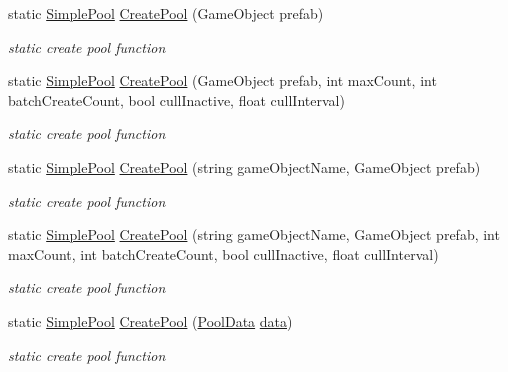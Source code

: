 \begin{DoxyCompactItemize}
static \hyperlink{class_darkhexxa_1_1_simple_pool_1_1_simple_pool}{Simple\-Pool} \hyperlink{class_darkhexxa_1_1_simple_pool_1_1_simple_pool_a857d7f94168bb44468149385efae0855}{Create\-Pool} (Game\-Object prefab)
\begin{DoxyCompactList}\small\item\em static create pool function \end{DoxyCompactList}\item 
static \hyperlink{class_darkhexxa_1_1_simple_pool_1_1_simple_pool}{Simple\-Pool} \hyperlink{class_darkhexxa_1_1_simple_pool_1_1_simple_pool_a03871bfb6c3c3e7c9a843a1b9f213bdc}{Create\-Pool} (Game\-Object prefab, int max\-Count, int batch\-Create\-Count, bool cull\-Inactive, float cull\-Interval)
\begin{DoxyCompactList}\small\item\em static create pool function \end{DoxyCompactList}\item 
static \hyperlink{class_darkhexxa_1_1_simple_pool_1_1_simple_pool}{Simple\-Pool} \hyperlink{class_darkhexxa_1_1_simple_pool_1_1_simple_pool_add1f33c5ffe05b3b02c723c4c3b73f0a}{Create\-Pool} (string game\-Object\-Name, Game\-Object prefab)
\begin{DoxyCompactList}\small\item\em static create pool function \end{DoxyCompactList}\item 
static \hyperlink{class_darkhexxa_1_1_simple_pool_1_1_simple_pool}{Simple\-Pool} \hyperlink{class_darkhexxa_1_1_simple_pool_1_1_simple_pool_aaca6d9386024a8b21caf25be6e12faee}{Create\-Pool} (string game\-Object\-Name, Game\-Object prefab, int max\-Count, int batch\-Create\-Count, bool cull\-Inactive, float cull\-Interval)
\begin{DoxyCompactList}\small\item\em static create pool function \end{DoxyCompactList}\item 
static \hyperlink{class_darkhexxa_1_1_simple_pool_1_1_simple_pool}{Simple\-Pool} \hyperlink{class_darkhexxa_1_1_simple_pool_1_1_simple_pool_acb1b2386d78e2c28b3432fc2fc46ee7e}{Create\-Pool} (\hyperlink{class_darkhexxa_1_1_simple_pool_1_1_simple_pool_1_1_pool_data}{Pool\-Data} \hyperlink{class_darkhexxa_1_1_simple_pool_1_1_simple_pool_ae49843e11db3e9491d166dba366c3fdf}{data})
\begin{DoxyCompactList}\small\item\em static create pool function \end{DoxyCompactList}\item 

\end{DoxyCompactItemize}
